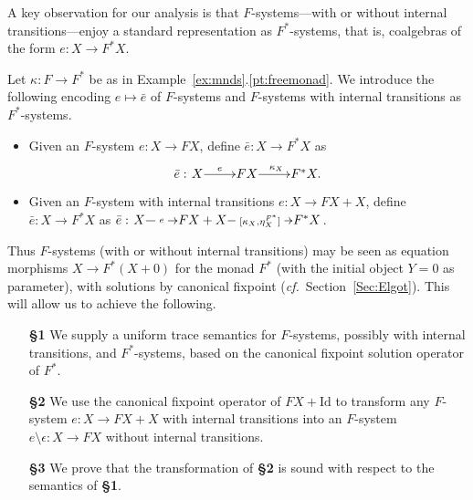 \documentclass[oribibl,envcountsame,envcountsect,runningheads]{llncs}
\newcommand{\free}[1]{{#1^*}}
\renewcommand{\>}{\rangle}
\def\Id{\mathrm{Id}}
\def\epselim#1{{#1}\!\setminus\! \epsilon}
\def\:{\colon}
\def\GF{F} \def\GFG{G} \def\MM{R} \def\quot{\xi} \def\quotG{\gamma}
\begin{document}
A key observation for our analysis is that $\GF $-systems---with or without internal transitions---enjoy a standard representation as $\free{\GF }$-systems, that is, coalgebras of the form $e\: X \to \free{\GF }X$.
\begin{definition}[$\GF $-systems as $\free{\GF }$-systems] \label{def:reprHtofreeH} Let $\kappa : \GF  \to \free{\GF }$ be as in Example~\ref{ex:mnds}.\ref{pt:freemonad}. We introduce the following encoding $e \mapsto \bar{e}$ of $\GF $-systems and $\GF $-systems with internal transitions as $\free{\GF }$-systems.
\begin{itemize}
  \item Given an $\GF $-system $e \colon X \to \GF X$, define $\bar{e} \colon X \to \free{\GF }X$ as
\[
\bar{e} : \xymatrix@1{X \ar[r]^-{e} & \GF X \ar[r]^{ \kappa_X} & \free{\GF }X.}
\]
\item Given an $\GF $-system with internal transitions $e : X \to \GF X + X$, define $\bar{e} : X \to \free{\GF }X$ as $\bar{e} : \xymatrix@1{X \ar[r]|-{\ e\ } & \GF X + X \ar[rr]|-{\ [ \kappa_X, \eta^{\free{\GF }}_X]\ } & & \free{\GF }X}$.
  \end{itemize}
\end{definition}
Thus $\GF $-systems (with or without internal transitions) may be seen as equation morphisms $X \to \free{\GF}(X+0)$ for the monad $\free{\GF }$ (with the initial object $Y = 0$ as parameter), with solutions by canonical fixpoint ({\em cf.}~Section~\ref{Sec:Elgot}). This will allow us to achieve the following.
\begin{enumerate}[label={(\arabic*)}]
  \item[\bf \S 1] We supply a uniform trace semantics for $\GF $-systems, possibly with internal transitions, and $\free{\GF }$-systems, based on the canonical fixpoint solution operator of $\free{\GF }$. \item[\bf \S 2] We use the canonical fixpoint operator of $\GF X + \Id$ to transform any $\GF $-system $e: X \to \GF X + X$ with internal transitions into an $\GF $-system $\epselim{e} : X \to \GF X$ without internal transitions. \item[\bf \S 3] We prove that the transformation of {\bf \S 2} is sound with respect to the semantics of {\bf \S 1}.
\end{enumerate}
\end{document}
